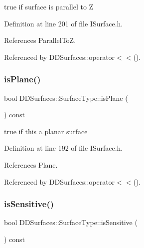 true if surface is parallel to Z 



Definition at line 201 of file I\+Surface.\+h.



References Parallel\+ToZ.



Referenced by D\+D\+Surfaces\+::operator$<$$<$().

\hypertarget{class_d_d_surfaces_1_1_surface_type_a41f77605ca254ef25add409173faf25b}{}\label{class_d_d_surfaces_1_1_surface_type_a41f77605ca254ef25add409173faf25b} 
\subsubsection{\texorpdfstring{is\+Plane()}{isPlane()}}
{\footnotesize\ttfamily bool D\+D\+Surfaces\+::\+Surface\+Type\+::is\+Plane (\begin{DoxyParamCaption}{ }\end{DoxyParamCaption}) const\hspace{0.3cm}{\ttfamily [inline]}}



true if this a planar surface 



Definition at line 192 of file I\+Surface.\+h.



References Plane.



Referenced by D\+D\+Surfaces\+::operator$<$$<$().

\hypertarget{class_d_d_surfaces_1_1_surface_type_a9dbbb4928f16176c6cd3cf183a6662f1}{}\label{class_d_d_surfaces_1_1_surface_type_a9dbbb4928f16176c6cd3cf183a6662f1} 
\subsubsection{\texorpdfstring{is\+Sensitive()}{isSensitive()}}
{\footnotesize\ttfamily bool D\+D\+Surfaces\+::\+Surface\+Type\+::is\+Sensitive (\begin{DoxyParamCaption}{ }\end{DoxyParamCaption}) const\hspace{0.3cm}{\ttfamily [inline]}}



